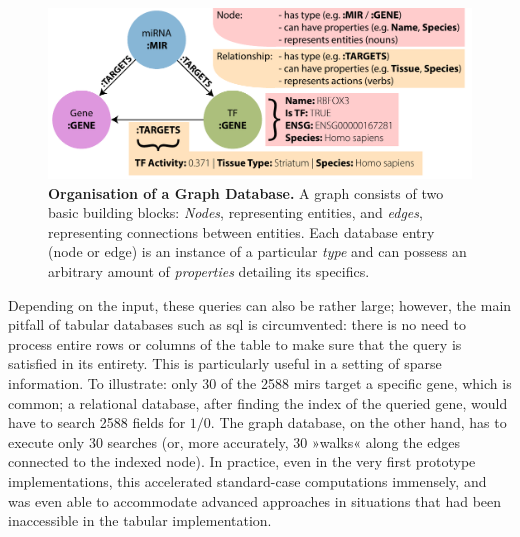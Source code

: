 \begin{figure}
\includegraphics[width=\textwidth]{figures/graph-org}
\caption[Organisation of a Graph Database.]{\textbf{Organisation of a Graph Database.} A graph consists of two basic building blocks: \textit{Nodes}, representing entities, and \textit{edges}, representing connections between entities. Each database entry (node or edge) is an instance of a particular \textit{type} and can possess an arbitrary amount of \textit{properties} detailing its specifics.
\label{fig:graph-org}}
\end{figure}

Depending on the input, these queries can also be rather large; however, the main pitfall of tabular databases such as \ac{sql} is circumvented: there is no need to process entire rows or columns of the table to make sure that the query is satisfied in its entirety. This is particularly useful in a setting of sparse information. To illustrate: only 30 of the 2588 \acp{mir} target a specific gene, which is common; a relational database, after finding the index of the queried gene, would have to search 2588 fields for $1/0$. The graph database, on the other hand, has to execute only 30 searches (or, more accurately, 30 »walks« along the edges connected to the indexed node). In practice, even in the very first prototype implementations, this accelerated standard-case computations immensely, and was even able to accommodate advanced approaches in situations that had been inaccessible in the tabular implementation.

